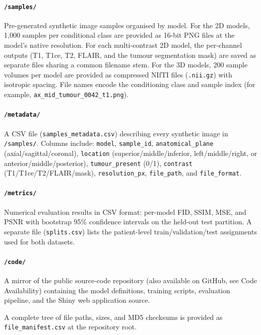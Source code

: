 \paragraph{\texttt{/samples/}} Pre-generated synthetic image samples organised by model.
For the 2D models, 1{,}000 samples per conditional class are provided as 16-bit PNG files at
the model's native resolution. For each multi-contrast 2D model, the per-channel outputs
(T1, T1ce, T2, FLAIR, and the tumour segmentation mask) are saved as separate files sharing a
common filename stem. For the 3D models, 200 sample volumes per model are provided as
compressed NIfTI files (\texttt{.nii.gz}) with isotropic spacing. File names encode the
conditioning class and sample index (for example, \texttt{ax\_mid\_tumour\_0042\_t1.png}).

\paragraph{\texttt{/metadata/}} A CSV file (\texttt{samples\_metadata.csv}) describing every
synthetic image in \texttt{/samples/}. Columns include: \texttt{model}, \texttt{sample\_id},
\texttt{anatomical\_plane} (axial/sagittal/coronal), \texttt{location}
(superior/middle/inferior, left/middle/right, or anterior/middle/posterior),
\texttt{tumour\_present} (0/1), \texttt{contrast} (T1/T1ce/T2/FLAIR/mask),
\texttt{resolution\_px}, \texttt{file\_path}, and \texttt{file\_format}.

\paragraph{\texttt{/metrics/}} Numerical evaluation results in CSV format: per-model FID,
SSIM, MSE, and PSNR with bootstrap 95\% confidence intervals on the held-out test partition.
A separate file (\texttt{splits.csv}) lists the patient-level train/validation/test
assignments used for both datasets.

\paragraph{\texttt{/code/}} A mirror of the public source-code repository (also available on
GitHub, see Code Availability) containing the model definitions, training scripts, evaluation
pipeline, and the Shiny web application source.

A complete tree of file paths, sizes, and MD5 checksums is provided as
\texttt{file\_manifest.csv} at the repository root.



